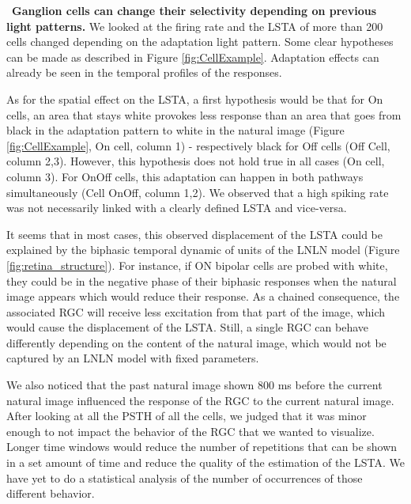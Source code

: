 \par~\textbf{Ganglion cells can change their selectivity depending on previous
    light patterns.}
We looked at the firing rate and the LSTA of more than 200 cells changed
depending on the adaptation light pattern. Some clear hypotheses can be made as
described in Figure \ref{fig:CellExample}. Adaptation effects can already be
seen in the temporal profiles of the responses.

As for the spatial effect on the LSTA, a first hypothesis would be that for On
cells, an area that stays white provokes less response than an area that goes
from black in the
adaptation pattern to white in the natural image (Figure \ref{fig:CellExample},
On cell, column 1) - respectively black for
Off cells (Off Cell, column 2,3). However, this hypothesis does not hold true
in all cases (On
cell, column 3). For OnOff cells, this adaptation can happen in both pathways
simultaneously
(Cell OnOff, column 1,2). We observed that a high spiking rate was not
necessarily linked with
a clearly defined LSTA and vice-versa.

It seems that in most cases, this observed displacement of the LSTA could be
explained by
the biphasic temporal dynamic of units of the LNLN model (Figure
\ref{fig:retina_structure}). For instance, if ON
bipolar cells are probed with white, they could be in the negative phase of
their
biphasic responses when the natural image appears which would reduce their
response. As a chained consequence, the associated RGC will receive less
excitation from that part of the image, which would cause the displacement of
the LSTA. Still, a single RGC can behave differently depending on the content
of the natural image, which would not be captured by an LNLN model with fixed
parameters.

We also noticed that the past natural image shown 800 ms before the current
natural image influenced
the response of the RGC to the current natural image. After looking at all the
PSTH of all the cells, we judged that it was minor enough to not impact the
behavior of the RGC that we wanted to visualize. Longer time windows would
reduce the number of repetitions that can be shown in a set amount of time and
reduce the quality of the estimation of the LSTA.
We have yet to do a statistical analysis of the number of occurrences of those
different behavior.


